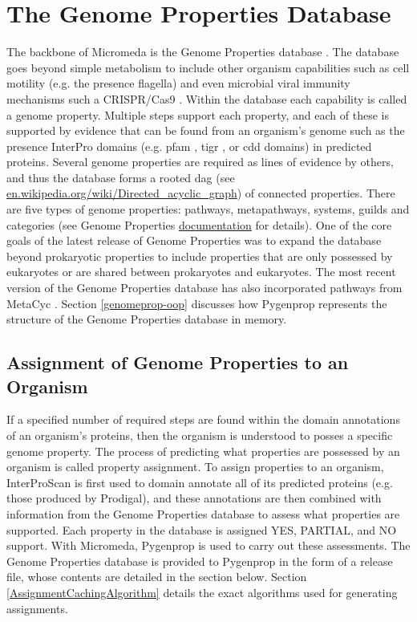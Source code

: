 \section{The Genome Properties Database} \label{genome-properties-overview}

The backbone of Micromeda is the Genome Properties database \cite{Haft2013}. The database goes beyond simple metabolism to include other organism capabilities such as cell motility (e.g. the presence flagella) and even microbial viral immunity mechanisms such a CRISPR/Cas9 \cite{horvath2010crispr}. Within the database each capability is called a genome property. Multiple steps support each property, and each of these is supported by evidence that can be found from an organism's genome such as the presence InterPro domains (e.g. \gls{pfam} \cite{bateman2004pfam}, \gls{tigr} \cite{haft2001tigrfams}, or \gls{cdd} \cite{marchler2014cdd} domains) in predicted proteins. Several genome properties are required as lines of evidence by others, and thus the database forms a rooted \gls{dag} (see \href{en.wikipedia.org/wiki/Directed\_acyclic\_graph}{en.wikipedia.org/wiki/Directed\_acyclic\_graph}) of connected properties. There are five types of genome properties: pathways, metapathways, systems, guilds and categories (see Genome Properties \href{genome-properties.readthedocs.io/en/latest/flatfile.html\#desc-file}{documentation} for details). One of the core goals of the latest release of Genome Properties was to expand the database beyond prokaryotic properties to include properties that are only possessed by eukaryotes or are shared between prokaryotes and eukaryotes. The most recent version of the Genome Properties database has also incorporated pathways from MetaCyc \cite{karp2002metacyc}. Section \ref{genomeprop-oop} discusses how Pygenprop represents the structure of the Genome Properties database in memory.

\subsection{Assignment of Genome Properties to an Organism}

If a specified number of required steps are found within the domain annotations of an organism's proteins, then the organism is understood to posses a specific genome property. The process of predicting what properties are possessed by an organism is called property assignment. To assign properties to an organism, InterProScan is first used to domain annotate all of its predicted proteins (e.g. those produced by Prodigal), and these annotations are then combined with information from the Genome Properties database to assess what properties are supported. Each property in the database is assigned YES, PARTIAL, and NO support. With Micromeda, Pygenprop is used to carry out these assessments. The Genome Properties database is provided to Pygenprop in the form of a release file, whose contents are detailed in the section below. Section \ref{AssignmentCachingAlgorithm} details the exact algorithms used for generating assignments.  

